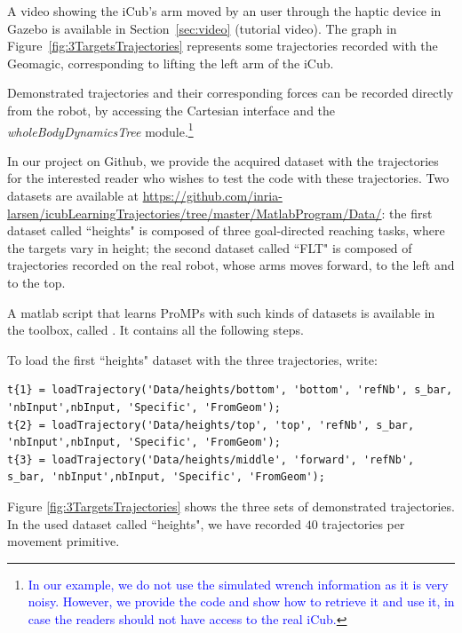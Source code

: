 \documentclass[utf8]{frontiersSCNS} %
\newcommand{\rev}[1]{\textcolor{blue}{#1}}
\begin{document}
A video showing the iCub's arm moved by an user through the haptic device in Gazebo is available in Section~\ref{sec:video} (tutorial video).
The graph in Figure~\ref{fig:3TargetsTrajectories} represents some trajectories recorded with the Geomagic, corresponding to lifting the left arm of the iCub. %


Demonstrated trajectories and their corresponding forces can be recorded directly from the robot, by accessing the Cartesian interface and the \textit{wholeBodyDynamicsTree} module.\footnote{\rev{In our example, we do not use the simulated wrench information as it is very noisy. However, we provide the code and show how to retrieve it and use it, in case the readers should not have access to the real iCub.}}

In our project on Github, we provide the acquired dataset with the trajectories for the interested reader who wishes to test the code with these trajectories. Two datasets are available at \url{https://github.com/inria-larsen/icubLearningTrajectories/tree/master/MatlabProgram/Data/}:  the first dataset called ``heights" is composed of three goal-directed reaching tasks, where the targets vary in height; the second dataset called ``FLT" is composed of trajectories recorded on the real robot, whose arms moves forward, to the left and to the top.

A matlab script that learns ProMPs with such kinds of datasets is available in the toolbox, called . It contains all the following steps.

To load the first ``heights" dataset with the three trajectories, write:
\begin{lstlisting}
t{1} = loadTrajectory('Data/heights/bottom', 'bottom', 'refNb', s_bar, 'nbInput',nbInput, 'Specific', 'FromGeom');
t{2} = loadTrajectory('Data/heights/top', 'top', 'refNb', s_bar, 'nbInput',nbInput, 'Specific', 'FromGeom');
t{3} = loadTrajectory('Data/heights/middle', 'forward', 'refNb', s_bar, 'nbInput',nbInput, 'Specific', 'FromGeom');
\end{lstlisting}

Figure \ref{fig:3TargetsTrajectories} shows the three sets of demonstrated trajectories. In the used dataset called 	``heights", we have recorded $40$ trajectories per movement primitive.
\end{document}
